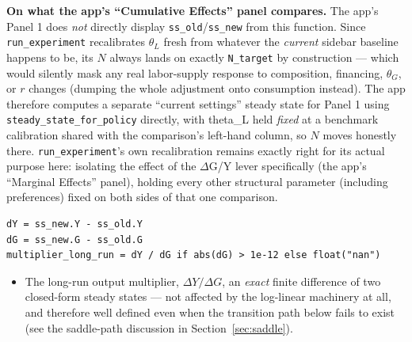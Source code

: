 \documentclass[11pt]{article}
\begin{document}
\begin{notebox}
\textbf{On what the app's ``Cumulative Effects'' panel compares.} The app's
Panel 1 does \emph{not} directly display \texttt{ss\_old}/\texttt{ss\_new}
from this function. Since \texttt{run\_experiment} recalibrates $\theta_L$
fresh from whatever the \emph{current} sidebar baseline happens to be, its
$N$ always lands on exactly \texttt{N\_target} by construction --- which
would silently mask any real labor-supply response to composition,
financing, $\theta_G$, or $r$ changes (dumping the whole adjustment onto
consumption instead). The app therefore computes a separate ``current
settings'' steady state for Panel 1 using \texttt{steady\_state\_for\_policy}
directly, with theta\_L held \emph{fixed} at a benchmark calibration
shared with the comparison's left-hand column, so $N$ moves honestly there.
\texttt{run\_experiment}'s own recalibration remains exactly right for its
actual purpose here: isolating the effect of the $\Delta$G/Y lever specifically
(the app's ``Marginal Effects'' panel), holding every other structural
parameter (including preferences) fixed on both sides of that one
comparison.
\end{notebox}

\begin{lstlisting}[firstnumber=445]
dY = ss_new.Y - ss_old.Y
dG = ss_new.G - ss_old.G
multiplier_long_run = dY / dG if abs(dG) > 1e-12 else float("nan")
\end{lstlisting}
\begin{itemize}
\item[\textbf{L445--L447}] The long-run output multiplier, $\Delta Y/\Delta
G$, an \emph{exact} finite difference of two closed-form steady states ---
not affected by the log-linear machinery at all, and therefore well
defined even when the transition path below fails to exist (see the
saddle-path discussion in Section~\ref{sec:saddle}).
\end{itemize}
\end{document}
